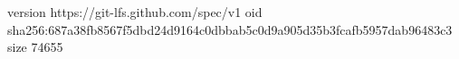version https://git-lfs.github.com/spec/v1
oid sha256:687a38fb8567f5dbd24d9164c0dbbab5c0d9a905d35b3fcafb5957dab96483c3
size 74655
